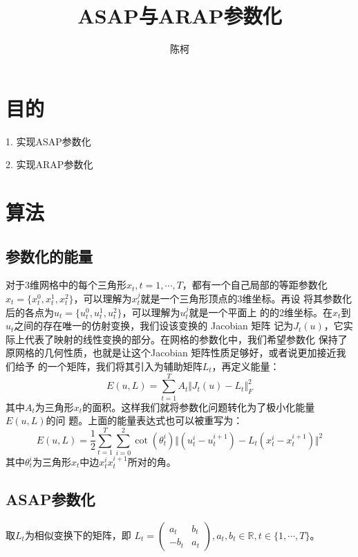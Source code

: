 \documentclass{article}
\title{ASAP与ARAP参数化}
\author{陈柯}
\begin{document}
	\maketitle
	
	\section{目的}
	
	1.	实现ASAP参数化
	
	2.  实现ARAP参数化
	
	\section{算法}
	\subsection{参数化的能量}
	对于3维网格中的每个三角形$x_t,t=1,\cdots,T$，都有一个自己局部的等距参数化
	$x_t=\{x_t^0,x_t^1,x_t^2\}$，可以理解为$x_t^j$就是一个三角形顶点的3维坐标。再设
	将其参数化后的各点为$u_t=\{u_t^0,u_t^1,u_t^2\}$，可以理解为$u_t^j$就是一个平面上
	的的2维坐标。在$x_t$到$u_t$之间的存在唯一的仿射变换，我们设该变换的 Jacobian 矩阵
	记为$J_t(u)$，它实际上代表了映射的线性变换的部分。在网格的参数化中，我们希望参数化
	保持了原网格的几何性质，也就是让这个Jacobian 矩阵性质足够好，或者说更加接近我们给予
	的一个矩阵，我们将其引入为辅助矩阵$L_t$，再定义能量：
	$$E(u,L)=\sum_{t=1}^{T}A_t\Vert J_t(u)-L_t\Vert_F^2$$
	其中$A_t$为三角形$x_t$的面积。这样我们就将参数化问题转化为了极小化能量$E(u,L)$的问
	题。上面的能量表达式也可以被重写为：
	$$E(u,L)=\frac{1}{2}\sum_{t=1}^{T}\sum_{i=0}^{2}\cot{(\theta_t^i)}
	\Vert(u_t^i-u_t^{i+1})-L_t(x_t^i-x_t^{i+1})\Vert^2$$
	其中$\theta_t^i$为三角形$x_t$中边$x_t^ix_t^{i+1}$所对的角。
	
	\subsection{ASAP参数化}
	取$L_t$为相似变换下的矩阵，即
	$L_t=\begin{pmatrix}   
		a_t&b_t\\-b_t&a_t
	\end{pmatrix},a_t,b_t\in\mathbb{R},t\in\{1,\cdots,T\}$。
\end{document}
